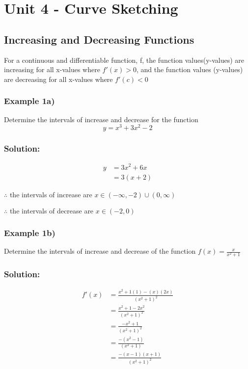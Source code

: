 \documentclass{article}
\begin{document}
\section{Unit 4 - Curve Sketching}
\subsection{Increasing and Decreasing Functions}
For a continuous and differentiable function, f, the function values(y-values) are increasing for all x-values where $f'(x)>0$, and the function values (y-values) are decreasing for all x-values where $f'(c)<0$
\subsubsection{Example 1a)}
Determine the intervals of increase and decrease for the function $$y=x^3+3x^2-2$$
\subsubsection*{Solution:}
\begin{align*}
    y&=3x^2+6x\\
    &=3(x+2)
\end{align*}
\begin{center}
\end{center}

$\therefore$ the intervals of increase are $x\in(-\infty,-2)\cup(0, \infty)$

$\therefore$ the intervals of decrease are $x\in (-2,0)$

\subsubsection{Example 1b)}
Determine the intervals of increase and decrease of the function $f(x)=\frac{x}{x^2+1}$
\subsubsection*{Solution:}
\begin{align*}
    f'(x)&=\frac{x^2+1(1)-(x)(2x)}{(x^2+1)^2}\\
    &=\frac{x^2+1-2x^2}{(x^2+1)^2}\\
    &=\frac{-x^2+1}{(x^2+1)^2}\\
    &=\frac{-(x^2-1)}{(x^2+1)}\\
    &=\frac{-(x-1)(x+1)}{(x^2+1)^2}
\end{align*}
\end{document}
